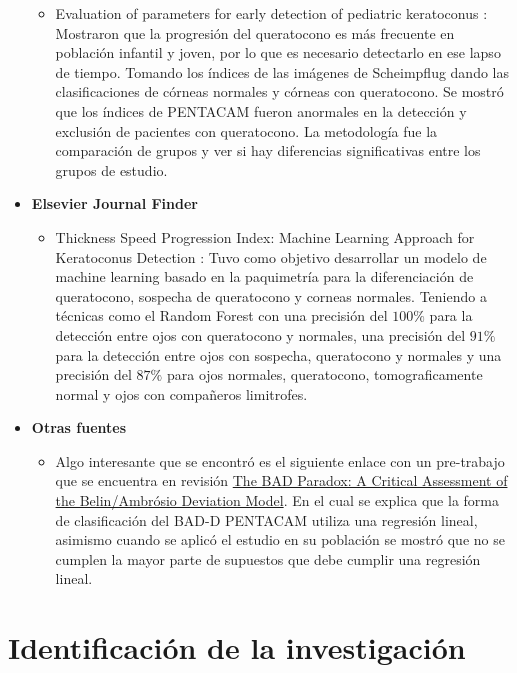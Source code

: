 \begin{itemize}
\begin{itemize}
        \item Evaluation of parameters for early detection of pediatric keratoconus \cite{zhao2024evaluation}: Mostraron que la progresión del queratocono es más frecuente en población infantil y joven, por lo que es necesario detectarlo en ese lapso de tiempo. Tomando los índices de las imágenes de Scheimpflug dando las clasificaciones de córneas normales y córneas con queratocono. Se mostró que los índices de PENTACAM fueron anormales en la detección y exclusión de pacientes con queratocono. La metodología fue la comparación de grupos y ver si hay diferencias significativas entre los grupos de estudio.
    \end{itemize}
    \item \textbf{Elsevier Journal Finder}
    \begin{itemize}
        \item Thickness Speed Progression Index: Machine Learning Approach for Keratoconus Detection \cite{awwad2025thickness}:  Tuvo como objetivo desarrollar un modelo de machine learning basado en la paquimetría para la diferenciación de queratocono, sospecha de queratocono y corneas normales. Teniendo a técnicas como el Random Forest con una precisión del $100\%$ para la detección entre ojos con queratocono y normales, una precisión del $91\%$ para la detección entre ojos con sospecha, queratocono y normales y una precisión del $87\%$ para ojos normales, queratocono, tomograficamente normal y ojos con compañeros limitrofes. 
    \end{itemize}
    \item \textbf{Otras fuentes}
    \begin{itemize}
        \item Algo interesante que se encontró es el siguiente enlace con un pre-trabajo que se encuentra en revisión \href{https://arxiv.org/html/2501.12531v1}{The BAD Paradox: A Critical Assessment of the Belin/Ambrósio Deviation Model}. En el cual se explica que la forma de clasificación del BAD-D PENTACAM utiliza una regresión lineal, asimismo cuando se aplicó el estudio en su población se mostró que no se cumplen la mayor parte de supuestos que debe cumplir una regresión lineal.
    \end{itemize}
\end{itemize}

\section{Identificación de la investigación}

